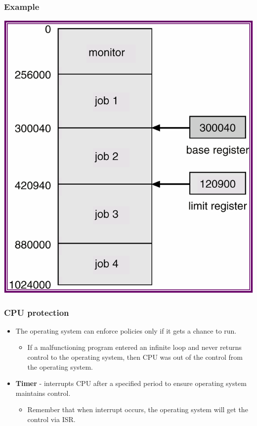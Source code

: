 \documentclass[CJKutf8,xcolor=pdftex,dvipsnames,table]{beamer}
\begin{document}
\begin{CJK*}{UTF8}{song}
  \begin{frame}
    \frametitle{Example} \pause
    \begin{center}
      \includegraphics[scale=0.5]{v6f2-9}
    \end{center}
  \end{frame}

  \begin{frame}
    \frametitle{CPU protection} \pause
    \begin{itemize}
    \item{The operating system can enforce policies only if it gets a chance to run.} \pause
      \begin{itemize}
      \item{If a malfunctioning program entered an infinite loop and never returns control to the operating system, then CPU was out of the control from the operating system.} \pause
      \end{itemize}
    \item{\textbf{Timer} \pause - interrupts CPU after a specified period to ensure operating system maintains control.} \pause
      \begin{itemize}
      \item{Remember that when interrupt occurs, the operating system will get the control via ISR.} \pause
      \end{itemize}
    \end{itemize}
  \end{frame}


\end{CJK*}
\end{document}
